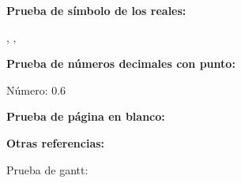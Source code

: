 \espaciodoble\textbf{Prueba de símbolo de los reales:}

\R, \Rcuadrado, \Rcubo

\espaciodoble\textbf{Prueba de números decimales con punto:}

Número: $0.6$

\espaciodoble\textbf{Prueba de página en blanco:}
\pagenblanco

\espaciodoble\textbf{Otras referencias:}

\cite{bond2014readings}

\cite{ashton2009internet}

\cite{balaji2010introduction}

\cite{causa2007computacion}

\cite{cuevas2015emociones}

\cite{dias2014fatima}

\cite{gil2015architecture}

\cite{jennings1998roadmap}

\cite{jiang2007ebdi}

\cite{maria2007emotional}

\cite{ortony1990cognitive}

\cite{perozo2008proposal}

\cite{perozo2011modelado}

\cite{perozo2012affective}

\cite{perozo2013self}

\cite{picard1995affective}

\cite{rincon2015social}

\cite{rodriguez2015computational}

\cite{rusell2004inteligencia}

\cite{schweitzer2007brownian}

\cite{weiser1993ubiquitous}

\cite{weiss1999multiagent}

\cite{yu2015emotional}

\break

Prueba de gantt:
\begin{ilustracion}[etiqueta=gantt, titulo=Prueba de Diagrama de Gantt]
	\begin{ganttchart}{1}{12}
		 \\
		 \\
		 \\
		 \\
	\end{ganttchart}
\end{ilustracion}
